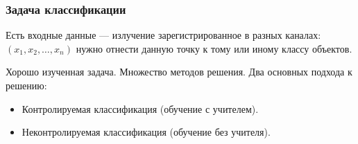 
\begin{frame}
    \frametitle{Задача классификации}
    Есть входные данные --- излучение зарегистрированное в разных каналах: $(x_1, x_2, \dots, x_n)$ нужно отнести данную
    точку к тому или иному классу объектов.

    Хорошо изученная задача. Множество методов решения. Два основных подхода к решению:
    \begin{itemize}
        \item Контролируемая классификация (обучение с учителем).
        \item Неконтролируемая классификация (обучение без учителя).
    \end{itemize}
\end{frame}
